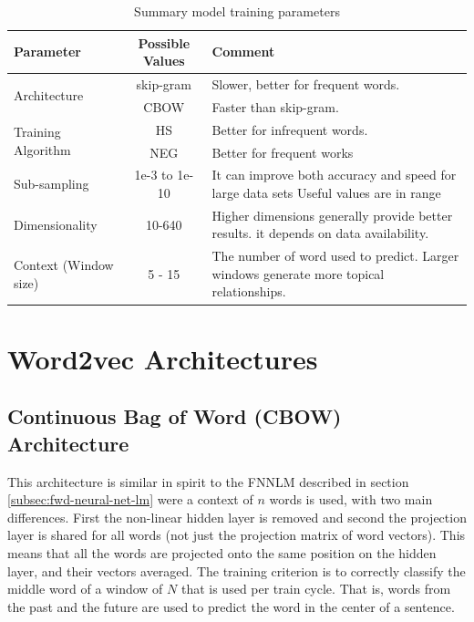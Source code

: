 \begin{table}[h]
   \centering
   \caption{Summary model training parameters} 
   \label{tab:word2_vec_parameters}
   
   \small
   \begin{tabular}{ |l|c|p{5cm}| }
   \hline           
    Parameter &  Possible Values & Comment \\  \hline           
    \multirow{2}{*}{Architecture}  & skip-gram  & Slower, better for frequent
    words. \\ 
    \cline{2-3}
    & \ac{CBOW}  &  Faster than skip-gram. \\ \hline
    \multirow{2}{*}{Training Algorithm}  & \ac{HS}  & Better for infrequent words.   \\ 
    \cline{2-3}
    & \ac{NEG} & Better for frequent works \\ \hline
    Sub-sampling  & 1e-3 to 1e-10  &  It  can improve both accuracy and speed for large data
    sets Useful values are in range \\ \hline
    Dimensionality  & 10-640 & Higher dimensions generally provide better results. 
    it depends on data availability.  \\ \hline
    Context (Window size)  & 5 - 15 & The number of word used to predict.
    Larger windows generate more topical relationships. \\ \hline

    
\end{tabular}
\end{table}


\section{Word2vec Architectures}
\label{sec:word2v-architectures}


\subsection{Continuous Bag of Word (CBOW) Architecture}

This architecture is similar in spirit to the  \ac{FNNLM} described in section
\ref{subsec:fwd-neural-net-lm} were a context of $n$ words is used,  with two main differences. First the
non-linear hidden layer is removed and second the projection layer is shared for
all words (not just the projection matrix of word vectors). This means that
all the words are projected onto the same position on the hidden layer,  and their vectors averaged.
The training criterion is to correctly classify the middle word of a window
of $N$ that is used per train cycle. That is, words from the past and the
future are used to predict the word in the center of a sentence. 


